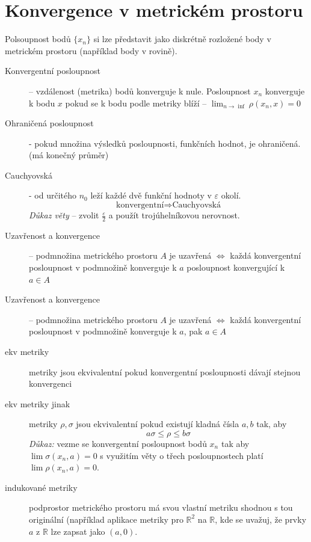 \documentclass[a4paper, twoside,%
12pt]{article}
\newcommand{\R}{\mathbb{R}}
\begin{document}
\section{Konvergence v metrickém prostoru}
Polsoupnost bodů $\lbrace x_n \rbrace$ si lze představit jako diskrétně rozložené body v metrickém prostoru (například body v rovině).
\begin{description}
    \item[Konvergentní posloupnost] -- vzdálenost (metrika) bodů konverguje k nule. Posloupnost $x_n$ konverguje k bodu $x$ pokud se k bodu podle metriky blíží -- $\lim_{n\to\inf} \rho(x_n, x) = 0$
    \item[Ohraničená posloupnost] - pokud množina výsledků posloupnosti, funkčních hodnot, je ohraničená. (má konečný průměr)
    \item[Cauchyovská] - od určitého $n_0$ leží každé dvě funkční hodnoty v $\varepsilon$ okolí.
    $$ \text{konvergentní} \Rightarrow \text{Cauchyovská}$$ 
    \emph{Důkaz věty} -- zvolit $\frac{\varepsilon}{2}$ a použít trojúhelníkovou nerovnost.
    \item[Uzavřenost a konvergence] -- podmnožina metrického prostoru $A$ je uzavřená $\Leftrightarrow$ každá konvergentní posloupnost v podmnožině konverguje k $a$ posloupnost konvergující k $a\in A$ 
    \item[Uzavřenost a konvergence] -- podmnožina metrického prostoru $A$ je uzavřená $\Leftrightarrow$ každá konvergentní posloupnost v podmnožině konverguje k $a$, pak $a\in A$ 
    \item[ekv metriky] metriky jsou ekvivalentní pokud konvergentní posloupnosti dávají stejnou konvergenci
    \item[ekv metriky jinak] metriky $\rho, \sigma$ jsou ekvivalentní pokud existují kladná čísla $a, b$ tak, aby
    $$ a\sigma \leq \rho \leq b\sigma $$
    \emph{Důkaz:} vezme se konvergentní posloupnost bodů $x_n$ tak aby $\lim \sigma (x_n, a) = 0$ s využitím věty o třech posloupnostech platí $\lim \rho (x_n, a) = 0$.
    \item[indukované metriky] podprostor metrického prostoru má svou vlastní metriku shodnou s tou originální (například aplikace metriky pro $\R^2$ na $\R$, kde se uvažuj, že prvky $a$ z $\R$ lze zapsat jako $(a,0)$.
\end{description}
\end{document}
